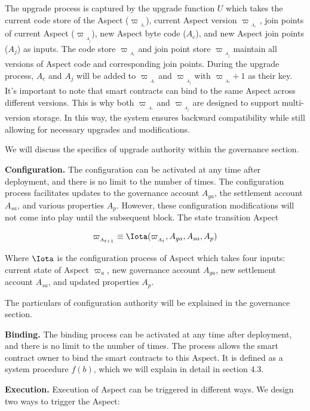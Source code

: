 The upgrade process is captured by the upgrade function $U$ which takes the current code store of the Aspect ($\varpi{_{_{A_c}}}$), current Aspect version $\varpi{_{_{A_v}}}$ , join points of current Aspect ($\varpi{_{_{A_j}}}$), new Aspect byte code ($A_c$), and new Aspect join points ($A_j$) as inputs. The code store $\varpi{_{_{A_c}}}$ and join point store $\varpi{_{_{A_j}}}$ maintain all versions of Aspect code and corresponding join points. During the upgrade process, $A_c$ and $A_j$ will be added to $\varpi{_{_{A_c}}}$ and $\varpi{_{_{A_j}}}$ with $\varpi{_{_{A_v}}} + 1$ as their key. It's important to note that smart contracts can bind to the same Aspect across different versions. This is why both $\varpi{_{_{A_c}}}$ and $\varpi{_{_{A_j}}}$ are designed to support multi-version storage. In this way, the system ensures backward compatibility while still allowing for necessary upgrades and modifications.

We will discuss the specifics of upgrade authority within the governance section.

\textbf{Configuration.} The configuration can be activated at any time after deployment, and there is no limit to the number of times. The configuration process facilitates updates to the governance account $A_{ga}$, the settlement account $A_{sa}$, and various properties $A_p$. However, these configuration modifications will not come into play until the subsequent block. The state transition Aspect 

\[
\varpi_{_{A_{t+1}}} \equiv \Iota(\varpi_{_{A_t}}, A_{ga},A_{sa},A_p)
\]

Where $\Iota$ is the configuration process of Aspect which takes four inputs: current state of Aspect $\varpi_a$, new governance account $A_{ga}$, new settlement account $A_{sa}$, and updated properties $A_p$.

The particulars of configuration authority will be explained in the governance section.

\textbf{Binding.} The binding process can be activated at any time after deployment, and there is no limit to the number of times. The process allows the smart contract owner to bind the smart contracts to this Aspect. It is defined as a system procedure $f(b)$, which we will explain in detail in section 4.3.

\textbf{Execution.} Execution of Aspect can be triggered in different ways. We design two ways to trigger the Aspect:

